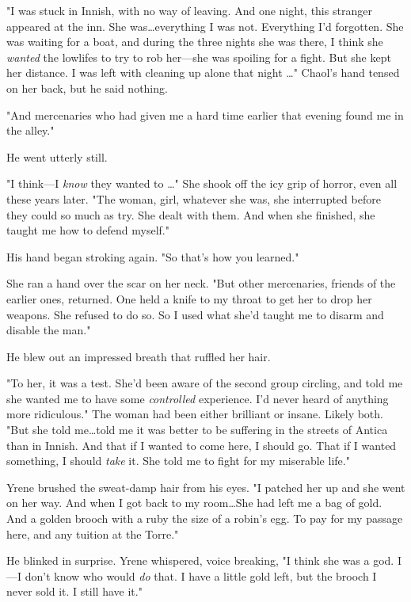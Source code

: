 "I was stuck in Innish, with no way of leaving.
And one night, this stranger appeared at the inn.
She was\ldots everything I was not.
Everything I'd forgotten.
She was waiting for a boat, and during the three nights she was there, I think she \emph{wanted} the lowlifes to try to rob her---she was spoiling for a fight.
But she kept her distance.
I was left with cleaning up alone that night \ldots" Chaol's hand tensed on her back, but he said nothing.

"And mercenaries who had given me a hard time earlier that evening found me in the alley."

He went utterly still.

"I think---I \emph{know} they wanted to \ldots" She shook off the icy grip of horror, even all these years later.
"The woman, girl, whatever she was, she interrupted before they could so much as try.
She 
dealt with them.
And when she finished, she taught me how to defend myself."

His hand began stroking again.
"So that's how you learned."

She ran a hand over the scar on her neck.
"But other mercenaries, friends of the earlier ones, returned.
One held a knife to my throat to get her to drop her weapons.
She refused to do so.
So I used what she'd taught me to disarm and disable the man."

He blew out an impressed breath that ruffled her hair.

"To her, it was a test.
She'd been aware of the second group circling, and told me she wanted me to have some \emph{controlled} experience.
I'd never heard of anything more ridiculous."
The woman had been either brilliant or insane.
Likely both.
"But she told me\ldots told me it was better to be suffering in the streets of Antica than in Innish.
And that if I wanted to come here, I should go.
That if I wanted something, I should \emph{take} it.
She told me to fight for my miserable life."

Yrene brushed the sweat-damp hair from his eyes.
"I patched her up and she went on her way.
And when I got back to my room\ldots She had left me a bag of gold.
And a golden brooch with a ruby the size of a robin's egg.
To pay for my passage here, and any tuition at the Torre."

He blinked in surprise.
Yrene whispered, voice breaking, "I think she was a god.
I---I don't know who would \emph{do} that.
I have a little gold left, but the brooch  I never sold it.
I still have it."

